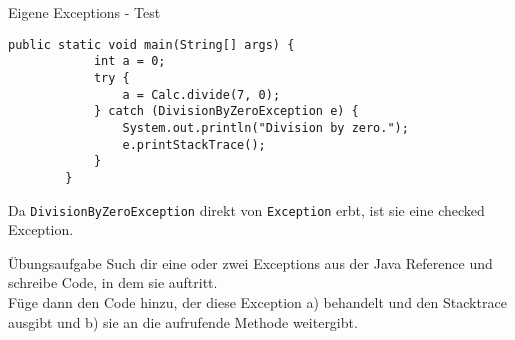 \begin{frame}[fragile]{Eigene Exceptions - Test}
    \begin{lstlisting}[gobble=8]
        public static void main(String[] args) {
            int a = 0;
            try {
                a = Calc.divide(7, 0);
            } catch (DivisionByZeroException e) {
                System.out.println("Division by zero.");
                e.printStackTrace();
            }
        }
    \end{lstlisting}
    Da \texttt{DivisionByZeroException} direkt von \texttt{Exception} erbt, ist sie eine checked Exception.
\end{frame}

\begin{frame}{Übungsaufgabe}
    \center
    \large{Such dir eine oder zwei Exceptions aus der Java Reference und schreibe Code, in dem sie auftritt. \\
    Füge dann den Code hinzu, der diese Exception a) behandelt und den Stacktrace ausgibt und b) sie an die aufrufende Methode weitergibt.}
\end{frame}


